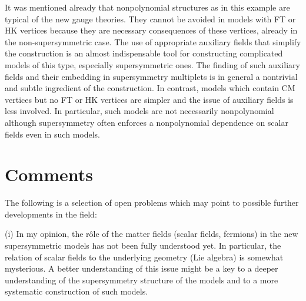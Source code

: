 \documentclass[a4paper,12pt]{article}
\begin{document}
It was mentioned already that nonpolynomial structures as in this
example are typical of the new gauge theories. 
They cannot be avoided in models with
FT or HK vertices because they are
necessary consequences of these vertices, already in the
non-supersymmetric case. The use of appropriate auxiliary
fields that simplify the construction is an almost
indispensable tool for constructing complicated models of this type, 
especially supersymmetric ones. The finding of such
auxiliary fields and their embedding in supersymmetry multiplets
is in general a nontrivial and subtle
ingredient of the construction.
In contrast, models which contain
CM vertices but no FT or HK vertices are simpler
and the issue of auxiliary fields is less involved. In particular,
such models are not necessarily nonpolynomial although
supersymmetry often enforces a nonpolynomial dependence
on scalar fields even in such models.

\section{Comments}\label{bra-comments}

The following is a selection of open problems which may point
to possible further developments in the field:

(i) In my opinion,
the r\^ole of the matter fields (scalar fields, fermions) 
in the new supersymmetric models
has not been fully understood yet.
In particular, the relation of scalar fields to the
underlying geometry (Lie algebra)
is somewhat mysterious. A better understanding of this issue
might be a key to a deeper understanding of the supersymmetry
structure of the models and to a more systematic construction
of such models.
\end{document}

